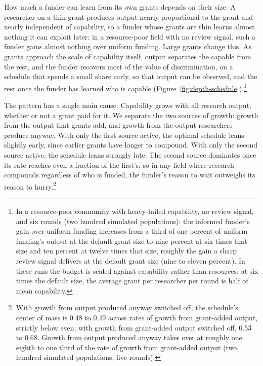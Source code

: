 \documentclass[article, 11pt, reqno]{amsart}
\theoremstyle{named}
\begin{document}


How much a funder can learn from its own grants depends on their size. A researcher on a thin grant produces output nearly proportional to the grant and nearly independent of capability, so a funder whose grants are thin learns almost nothing it can exploit later: in a resource-poor field with no review signal, such a funder gains almost nothing over uniform funding. Large grants change this. As grants approach the scale of capability itself, output separates the capable from the rest, and the funder recovers most of the value of discrimination, on a schedule that spends a small share early, so that output can be observed, and the rest once the funder has learned who is capable (Figure~\ref{fig:depth-schedule}).\footnote{In a resource-poor community with heavy-tailed capability, no review signal, and six rounds (two hundred simulated populations): the informed funder's gain over uniform funding increases from a third of one percent of uniform funding's output at the default grant size to nine percent at six times that size and ten percent at twelve times that size, roughly the gain a sharp review signal delivers at the default grant size (nine to eleven percent). In these runs the budget is scaled against capability rather than resources: at six times the default size, the average grant per researcher per round is half of mean capability.}



The pattern has a single main cause. Capability grows with all research output, whether or not a grant paid for it. We separate the two sources of growth: growth from the output that grants add, and growth from the output researchers produce anyway. With only the first source active, the optimal schedule leans slightly early, since earlier grants have longer to compound. With only the second source active, the schedule leans strongly late. The second source dominates once its rate reaches even a fraction of the first's, so in any field where research compounds regardless of who is funded, the funder's reason to wait outweighs its reason to hurry.\footnote{With growth from output produced anyway switched off, the schedule's center of mass is 0.48 to 0.49 across rates of growth from grant-added output, strictly below even; with growth from grant-added output switched off, 0.53 to 0.68. Growth from output produced anyway takes over at roughly one eighth to one third of the rate of growth from grant-added output (two hundred simulated populations, five rounds).}
\end{document}
